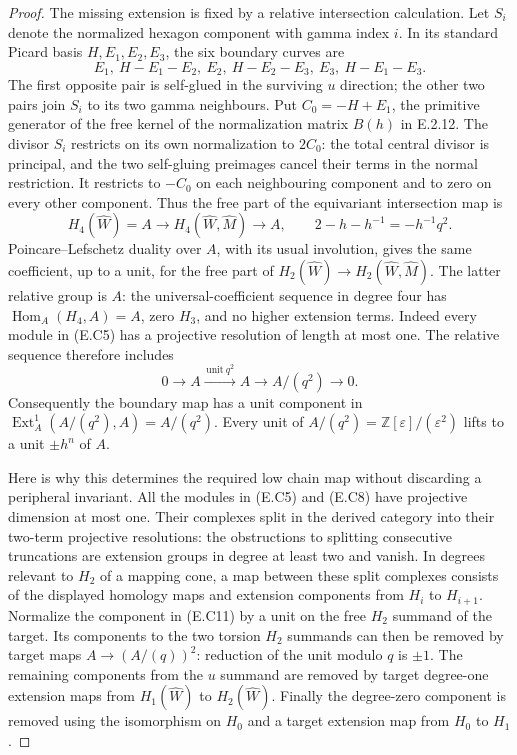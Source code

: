 \begin{proof}
The missing extension is fixed by a relative intersection
calculation. Let $S_i$ denote the normalized hexagon
component with gamma index $i$. In its standard Picard
basis $H,E_1,E_2,E_3$, the six boundary curves are
\[
 E_1,\ H-E_1-E_2,\ E_2,\ H-E_2-E_3,
                       \ E_3,\ H-E_1-E_3.
 \tag{E.C9}
\]
The first opposite pair is self-glued in the surviving
$u$ direction; the other two pairs join $S_i$ to its
two gamma neighbours. Put $C_0=-H+E_1$, the primitive
generator of the free kernel of the normalization matrix
$B(h)$ in E.2.12. The divisor $S_i$ restricts on its
own normalization to $2C_0$: the total central divisor
is principal, and the two self-gluing preimages cancel
their terms in the normal restriction. It restricts
to $-C_0$ on each neighbouring component and to zero
on every other component. Thus the free part of the
equivariant intersection map is
\[
 H_4(\widehat W)=A\longrightarrow
 H_4(\widehat W,\widehat M)\longrightarrow A,
 \qquad 2-h-h^{-1}=-h^{-1}q^2.
 \tag{E.C10}
\]
Poincare--Lefschetz duality over $A$, with its usual
involution, gives the same coefficient, up to a unit,
for the free part of $H_2(\widehat W)\to
H_2(\widehat W,\widehat M)$. The latter relative group
is $A$: the universal-coefficient sequence in degree
four has $\operatorname{Hom}_A(H_4,A)=A$, zero $H_3$,
and no higher extension terms. Indeed every module
in (E.C5) has a projective resolution of length at
most one. The relative sequence therefore includes
\[
 0\longrightarrow A\xrightarrow{\,\text{unit}\ q^2\,}A
  \longrightarrow A/(q^2)\longrightarrow0.
 \tag{E.C11}
\]
Consequently the boundary map has a unit component in
$\operatorname{Ext}^1_A(A/(q^2),A)=A/(q^2)$.
Every unit of $A/(q^2)=\mathbb Z[\varepsilon]/(\varepsilon^2)$
lifts to a unit $\pm h^n$ of $A$.

Here is why this determines the required low chain map
without discarding a peripheral invariant. All the
modules in (E.C5) and (E.C8) have projective dimension
at most one. Their complexes split in the derived
category into their two-term projective resolutions:
the obstructions to splitting consecutive truncations
are extension groups in degree at least two and vanish.
In degrees relevant to $H_2$ of a mapping cone, a map
between these split complexes consists of the displayed
homology maps and extension components from $H_i$ to
$H_{i+1}$. Normalize the component in (E.C11) by a unit
on the free $H_2$ summand of the target. Its components
to the two torsion $H_2$ summands can then be removed
by target maps $A\to(A/(q))^2$: reduction of the unit
modulo $q$ is $\pm1$. The remaining components from
the $u$ summand are removed by target degree-one
extension maps from $H_1(\widehat W)$ to
$H_2(\widehat W)$. Finally the degree-zero component
is removed using the isomorphism on $H_0$ and a target
extension map from $H_0$ to $H_1$.


\end{proof}
